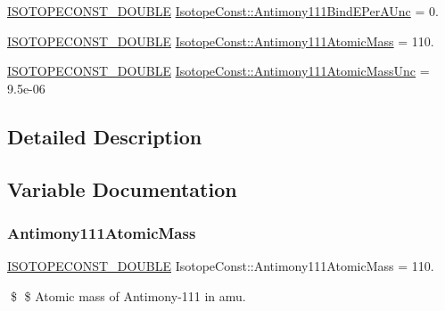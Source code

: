 \begin{DoxyCompactItemize}
\mbox{\hyperlink{group___isotope_const-_macros_ga8f45a7272ce02c0b4c65c44636ed719a}{I\+S\+O\+T\+O\+P\+E\+C\+O\+N\+S\+T\+\_\+\+D\+O\+U\+B\+LE}} \mbox{\hyperlink{group___isotope_const-_antimony-_sb111_ga38ccd6335c030e6f8786ac2b92e3c90a}{Isotope\+Const\+::\+Antimony111\+Bind\+E\+Per\+A\+Unc}} = 0.
\item 
\mbox{\hyperlink{group___isotope_const-_macros_ga8f45a7272ce02c0b4c65c44636ed719a}{I\+S\+O\+T\+O\+P\+E\+C\+O\+N\+S\+T\+\_\+\+D\+O\+U\+B\+LE}} \mbox{\hyperlink{group___isotope_const-_antimony-_sb111_gac678dc7bd74f386dc5b782ffe989924a}{Isotope\+Const\+::\+Antimony111\+Atomic\+Mass}} = 110.
\item 
\mbox{\hyperlink{group___isotope_const-_macros_ga8f45a7272ce02c0b4c65c44636ed719a}{I\+S\+O\+T\+O\+P\+E\+C\+O\+N\+S\+T\+\_\+\+D\+O\+U\+B\+LE}} \mbox{\hyperlink{group___isotope_const-_antimony-_sb111_gae6383fa309dadedd51be35a82ae98a13}{Isotope\+Const\+::\+Antimony111\+Atomic\+Mass\+Unc}} = 9.\+5e-\/06
\end{DoxyCompactItemize}


\subsection{Detailed Description}


\subsection{Variable Documentation}
\mbox{\label{group___isotope_const-_antimony-_sb111_gac678dc7bd74f386dc5b782ffe989924a}} 
\subsubsection{\texorpdfstring{Antimony111\+Atomic\+Mass}{Antimony111AtomicMass}}
{\footnotesize\ttfamily \mbox{\hyperlink{group___isotope_const-_macros_ga8f45a7272ce02c0b4c65c44636ed719a}{I\+S\+O\+T\+O\+P\+E\+C\+O\+N\+S\+T\+\_\+\+D\+O\+U\+B\+LE}} Isotope\+Const\+::\+Antimony111\+Atomic\+Mass = 110.}

\$ \$ Atomic mass of Antimony-\/111 in amu. \mbox{\label{group___isotope_const-_antimony-_sb111_gae6383fa309dadedd51be35a82ae98a13}} 
